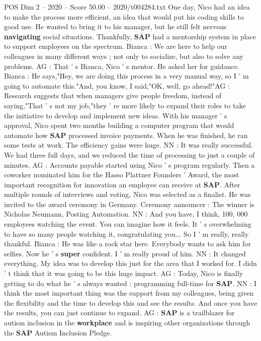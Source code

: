 \begin{textsample}{POS Dim 2 – 2020 – Score 50.00 – 2020/t004284.txt}
One day, Nico had an idea to make the process more efficient, an idea that would put his coding skills to good use.
He wanted to bring it to his manager, but he still felt nervous \textbf{navigating} social situations.
Thankfully, \textbf{SAP} had a mentorship system in place to support employees on the spectrum.
Bianca : We are here to help our colleagues in many different ways ; not only to socialize, but also to solve any problems.
AG : That ' s Bianca, Nico ' s mentor.
He asked her for guidance.
Bianca : He says,"Hey, we are doing this process in a very manual way, so I ' m going to automate this."And, you know, I said,"OK, well, go ahead!"AG : Research suggests that when managers give people freedom, instead of saying,"That ' s not my job,"they ' re more likely to expand their roles to take the initiative to develop and implement new ideas.
With his manager ' s approval, Nico spent two months building a computer program that would automate how \textbf{SAP} processed invoice payments.
When he was finished, he ran some tests at work.
The efficiency gains were huge.
NN : It was really successful.
We had three full days, and we reduced the time of processing to just a couple of minutes.
AG : Accounts payable started using Nico ' s program regularly.
Then a coworker nominated him for the Hasso Plattner Founders ' Award, the most important recognition for innovation an employee can receive at \textbf{SAP}.
After multiple rounds of interviews and voting, Nico was selected as a finalist.
He was invited to the award ceremony in Germany.
Ceremony announcer : The winner is Nicholas Neumann, Posting Automation.
NN : And you have, I think, 100, 000 employees watching the event.
You can imagine how it feels.
It ' s overwhelming to have so many people watching it, congratulating you...
So I ' m really, really thankful.
Bianca : He was like a rock star here.
Everybody wants to ask him for selfies.
Now he ' s \textbf{super} confident.
I ' m really proud of him.
NN : It changed everything.
My idea was to develop this just for the area that I worked for.
I didn ' t think that it was going to be this huge impact.
AG : Today, Nico is finally getting to do what he ' s always wanted : programming full-time for \textbf{SAP}.
NN : I think the most important thing was the support from my colleagues, being given the flexibility and the time to develop this and see the results.
And once you have the results, you can just continue to expand.
AG : \textbf{SAP} is a trailblazer for autism inclusion in the \textbf{workplace} and is inspiring other organizations through the \textbf{SAP} Autism Inclusion Pledge.

\end{textsample}
